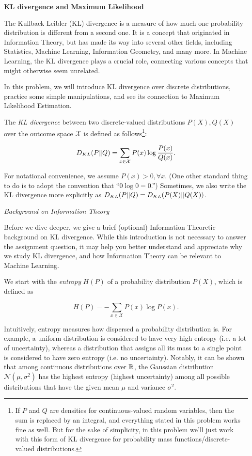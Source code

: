 \item {} {\bf KL divergence and Maximum Likelihood}

The Kullback-Leibler (KL) divergence is a measure of how much
one probability distribution is different from a second one. It is a concept that originated in Information Theory, but has made its
way into several other fields, including Statistics, Machine Learning,
Information Geometry, and many more. In Machine Learning, the KL
divergence plays a crucial role, connecting various concepts
that might otherwise seem unrelated.

In this problem, we will introduce KL divergence over discrete
distributions, practice some simple manipulations, and see its
connection to Maximum Likelihood Estimation.

The \emph{KL divergence} between two discrete-valued
distributions $P(X), Q(X)$  over the outcome space $\mathcal{X}$ is defined as follows\footnote{If $P$ and $Q$ are densities for continuous-valued random variables, then the sum is replaced by an integral, and everything stated in this problem works fine as well.  But for the sake of simplicity, in this problem we'll just work with this form of KL divergence for probability mass functions/discrete-valued distributions.}:

$$D_{KL}(P\|Q) = \sum_{x \in \mathcal{X}}P(x)\log\frac{P(x)}{Q(x)}.$$

For notational convenience, we assume $P(x)>0, \forall x$.
(One other standard thing to do is to adopt the convention that
``$0 \log 0 = 0$.'')  Sometimes, we also write the KL divergence more explicitly as
$D_{KL}(P||Q) = D_{KL}(P(X)||Q(X))$.

\emph{Background on Information Theory}

Before we dive deeper, we give a brief (optional) Information Theoretic
background on KL divergence. While this introduction is not necessary
to answer the assignment question, it may help you better understand
and appreciate why we study KL divergence, and how Information Theory
can be relevant to Machine Learning.

We start with the \emph{entropy} $H(P)$ of a probability distribution $P(X)$, which is defined as

$$ H(P) = -\sum_{x \in \mathcal{X}} P(x) \log P(x). $$

Intuitively, entropy measures how dispersed a probability
distribution is. For example, a uniform distribution is considered to have
very high entropy (i.e. a lot of uncertainty), whereas a distribution that assigns
all its mass to a single point is considered to have zero entropy (i.e. no uncertainty). Notably, it can be shown that among continuous distributions over $\mathbb{R}$, the Gaussian
distribution $\mathcal{N}(\mu,\sigma^2)$ has the highest entropy (highest uncertainty) among all possible distributions that have the given mean $\mu$ and variance $\sigma^2$.

